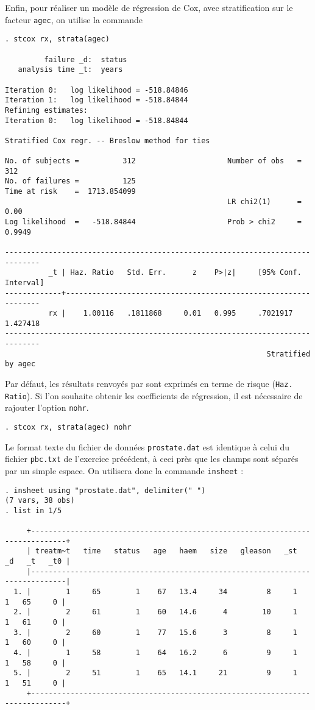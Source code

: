 Enfin, pour réaliser un modèle de régression de Cox, avec stratification sur
le facteur \verb|agec|, on utilise la commande 
\begin{verbatim}
. stcox rx, strata(agec)

         failure _d:  status
   analysis time _t:  years

Iteration 0:   log likelihood = -518.84846
Iteration 1:   log likelihood = -518.84844
Refining estimates:
Iteration 0:   log likelihood = -518.84844

Stratified Cox regr. -- Breslow method for ties

No. of subjects =          312                     Number of obs   =       312
No. of failures =          125
Time at risk    =  1713.854099
                                                   LR chi2(1)      =      0.00
Log likelihood  =   -518.84844                     Prob > chi2     =    0.9949

------------------------------------------------------------------------------
          _t | Haz. Ratio   Std. Err.      z    P>|z|     [95% Conf. Interval]
-------------+----------------------------------------------------------------
          rx |    1.00116   .1811868     0.01   0.995     .7021917    1.427418
------------------------------------------------------------------------------
                                                            Stratified by agec
\end{verbatim}
Par défaut, les résultats renvoyés par \Stata sont exprimés en terme de
risque (\verb|Haz. Ratio|). Si l'on souhaite obtenir les coefficients de
régression, il est nécessaire de rajouter l'option \verb|nohr|.
\begin{verbatim}
. stcox rx, strata(agec) nohr
\end{verbatim}
%
%
%
\soln{\ref{exo:11.2}}
Le format texte du fichier de données \texttt{prostate.dat} est identique à
celui du fichier \texttt{pbc.txt} de l'exercice précédent, à ceci près que
les champs sont séparés par un simple espace. On utilisera donc la commande
\texttt{insheet} :
\begin{verbatim}
. insheet using "prostate.dat", delimiter(" ")
(7 vars, 38 obs)
. list in 1/5

     +------------------------------------------------------------------------------+
     | treatm~t   time   status   age   haem   size   gleason   _st   _d   _t   _t0 |
     |------------------------------------------------------------------------------|
  1. |        1     65        1    67   13.4     34         8     1    1   65     0 |
  2. |        2     61        1    60   14.6      4        10     1    1   61     0 |
  3. |        2     60        1    77   15.6      3         8     1    1   60     0 |
  4. |        1     58        1    64   16.2      6         9     1    1   58     0 |
  5. |        2     51        1    65   14.1     21         9     1    1   51     0 |
     +------------------------------------------------------------------------------+
\end{verbatim}
